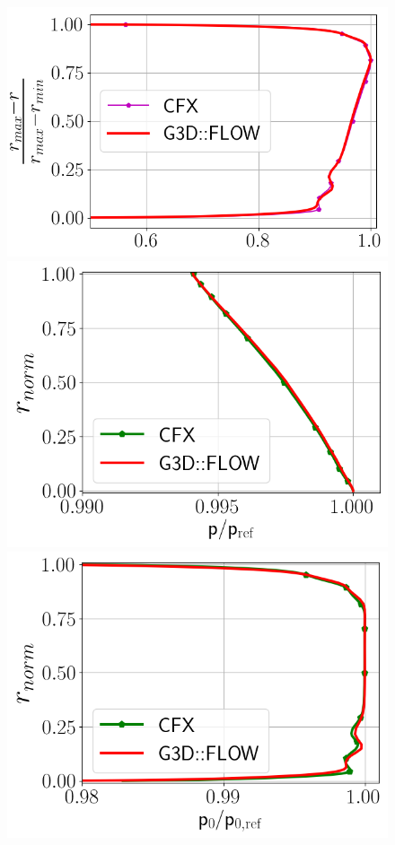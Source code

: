 \begin{figure}[h!]
  \centering
  \begin{minipage}{0.48\columnwidth}
  \includegraphics[width=1.\textwidth]{Figures/MaMave_FT.png}
  \end{minipage}
  \begin{minipage}{0.48\columnwidth}
  \includegraphics[width=1.\textwidth]{Figures/PAave_FT.png}
  \end{minipage}
  \begin{minipage}{0.48\columnwidth}
  \includegraphics[width=1.\textwidth]{Figures/P0Mave_FT.png}

\end{minipage}
\end{figure}
